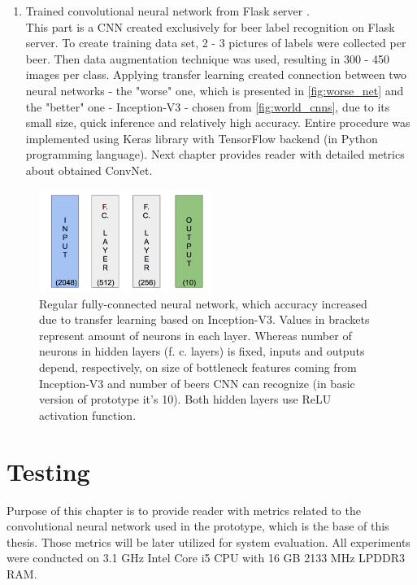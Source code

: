 \documentclass[11pt]{article}
\begin{document}
\begin{enumerate}[1)]
\item Trained convolutional neural network from Flask server \cite{cnn_repo} \cite{data_augm_repo}. \\
This part is a CNN created exclusively for beer label recognition on Flask server. To create training data set, 2 - 3 pictures of labels were collected per beer. Then data augmentation technique was used, resulting in 300 - 450 images per class. Applying transfer learning created connection between two neural networks - the "worse" one, which is presented in \autoref{fig:worse_net} and the "better" one - Inception-V3 - chosen from \autoref{fig:world_cnns}, due to its small size, quick inference and relatively high accuracy. Entire procedure was implemented using Keras library with TensorFlow backend (in Python programming language). Next chapter provides reader with detailed metrics about obtained ConvNet. 
\end{enumerate}

\begin{figure}[h]
\includegraphics[width=0.5\textwidth]{worse_net}
\centering
\caption{Regular fully-connected neural network, which accuracy increased due to transfer learning based on Inception-V3. Values in brackets represent amount of neurons in each layer. Whereas number of neurons in hidden layers (f. c. layers) is fixed, inputs and outputs depend, respectively, on size of bottleneck features coming from Inception-V3 and number of beers CNN can recognize (in basic version of prototype it's 10). Both hidden layers use ReLU activation function.}
\label{fig:worse_net}
\end{figure}
\clearpage

\section{Testing} \label{testing}
Purpose of this chapter is to provide reader with metrics related to the convolutional neural network used in the prototype, which is the base of this thesis. Those metrics will be later utilized for system evaluation. All experiments were conducted on 3.1 GHz Intel Core i5 CPU with 16 GB 2133 MHz LPDDR3 RAM.\\
\end{document}
